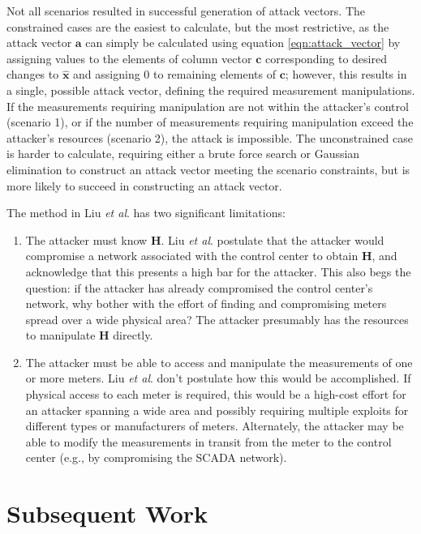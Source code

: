 \documentclass{article}
\begin{document}
Not all scenarios resulted in successful generation of attack vectors.  The constrained cases are the easiest to calculate, but the most restrictive, as the attack vector $\mathbf{a}$ can simply be calculated using equation \eqref{eqn:attack_vector} by assigning values to the elements of column vector $\mathbf{c}$ corresponding to desired changes to $\mathbf{\hat{x}}$ and assigning $0$ to remaining elements of $\mathbf{c}$; however, this results in a single, possible attack vector, defining the required measurement manipulations.  If the measurements requiring manipulation are not within the attacker's control (scenario 1), or if the number of measurements requiring manipulation exceed the attacker's resources (scenario 2), the attack is impossible.  The unconstrained case is harder to calculate, requiring either a brute force search or Gaussian elimination to construct an attack vector meeting the scenario constraints, but is more likely to succeed in constructing an attack vector.

The method in Liu \textit{et al}. has two significant limitations:
\begin{enumerate}
    \item The attacker must know $\mathbf{H}$.  Liu \textit{et al}. postulate that the attacker would compromise a network associated with the control center to obtain $\mathbf{H}$, and acknowledge that this presents a high bar for the attacker.  This also begs the question:  if the attacker has already compromised the control center's network, why bother with the effort of finding and compromising meters spread over a wide physical area?  The attacker presumably has the resources to manipulate $\mathbf{H}$ directly.
    \item The attacker must be able to access and manipulate the measurements of one or more meters.  Liu \textit{et al}. don't postulate how this would be accomplished.  If physical access to each meter is required, this would be a high-cost effort for an attacker spanning a wide area and possibly requiring multiple exploits for different types or manufacturers of meters.  Alternately, the attacker may be able to modify the measurements in transit from the meter to the control center (e.g., by compromising the SCADA network).
\end{enumerate}

\section{Subsequent Work}
\end{document}
